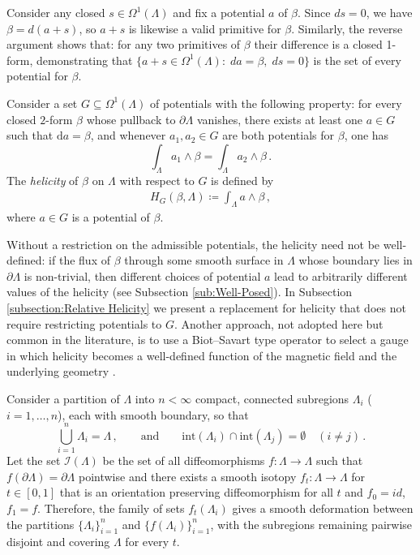 \documentclass[11pt]{article}
\theoremstyle{plain}
\theoremstyle{definition}
\theoremstyle{remark}
\newcommand{\ST}{\Lambda}
\newcommand{\I}{\mathcal{I}(\ST)}
\begin{document}
Consider any closed \( s \in \Omega^1(\ST) \) and fix a potential \(a\) of \(\beta\). Since \( ds = 0 \), we have \( \beta  = d(a + s) \), so \( a + s \) is likewise a valid primitive for \( \beta  \). Similarly, the reverse argument shows that: for any two primitives of \(\beta \) their difference is a closed 1-form, demonstrating that \(\{a+s \in \Omega^1(\ST) : \; da = \beta  ,\; ds=0\} \) is the set of every potential for \(\beta \). 


Consider a set \(G \subseteq \Omega^1(\ST)\) of potentials with the following property: for every closed \(2\)-form \(\beta \) whose pullback to \(\partial \ST\) vanishes, there exists at least one \(a \in G\) such that \(\mathrm{d}a = \beta \), and whenever \(a_1,a_2 \in G\) are both potentials for \(\beta \), one has
\[
\int_{\ST} a_1 \wedge \beta  = \int_{\ST} a_2 \wedge \beta  \, .
\]
The \emph{helicity} of \(\beta \) on \(\ST\) with respect to \(G\) is defined by
\begin{align*}
  H_G(\beta ,\ST) \coloneqq \int_{\ST} a \wedge \beta  \, ,
\end{align*}
where \(a \in G\) is a potential of \(\beta \).

Without a restriction on the admissible potentials, the helicity need not be well-defined: if the flux of \(\beta \) through some smooth surface in \(\ST\) whose boundary lies in \(\partial \ST\) is non-trivial, then different choices of potential \(a\) lead to arbitrarily different values of the helicity (see Subsection \ref{sub:Well-Posed}). In Subsection \ref{subsection:Relative Helicity} we present a replacement for helicity that does not require restricting potentials to \(G\). Another approach, not adopted here but common in the literature, is to use a Biot--Savart type operator to select a gauge in which helicity becomes a well-defined function of the magnetic field and the underlying geometry \cite{parsley2001taylor, Arnold_Topological_Methods, soperimetric_problems_helicity, CANTARELLA20101127, MacTaggart_2023}.





Consider a partition of \(\ST\) into \(n<\infty\) compact, connected subregions \(\ST_i\) (\(i=1,\dots,n\)), each with smooth boundary, so that
\[
    \bigcup_{i=1}^n \ST_i = \ST \, ,
    \qquad \text{and} \qquad
    \mathrm{int}(\ST_i)\cap \mathrm{int}(\ST_j)=\emptyset
    \quad (i\neq j) \, .
\]
Let the set \(\I\) be the set of all diffeomorphisms \(f: \ST\to \ST\) such that \(f(\partial \ST) = \partial \ST\) pointwise and there exists a smooth isotopy \(f_t : \ST\to \ST\) for \(t \in [0,1]\) that is an orientation preserving diffeomorphism for all \(t\) and \(f_0 = id\), \(f_1 = f\). Therefore, the family of sets \(f_t (\ST_i)\) gives a smooth deformation between the partitions \(\{\ST_i\}_{i=1}^n \) and \( \{ f( \ST_i)\}_{i=1}^n\), with the subregions remaining pairwise disjoint and covering \(\ST\) for every \(t\).
\end{document}
